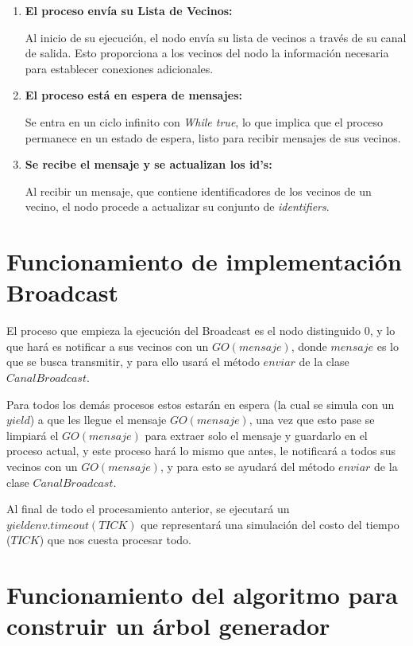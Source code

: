 \begin{enumerate}
	\item \textbf{El proceso envía su Lista de Vecinos:}
	
	Al inicio de su ejecución, el nodo envía su lista de vecinos a través de su canal de salida. Esto proporciona a los vecinos del nodo la información necesaria para establecer conexiones adicionales.
	
	\item \textbf{El proceso está en espera de mensajes: }
	
	 Se entra en un ciclo infinito con \textit{While true}, lo que implica que el proceso permanece en un estado de espera, listo para recibir mensajes de sus vecinos. 
	 
	 \item \textbf{Se recibe el mensaje y se actualizan los id's: }
	 
	  Al recibir un mensaje, que contiene identificadores de los vecinos de un vecino, el nodo procede a actualizar su conjunto de \textit{identifiers}. 
\end{enumerate}


\section{Funcionamiento de implementación Broadcast}

El proceso que empieza la ejecución del Broadcast es el nodo distinguido \(0\), y lo que hará es notificar a sus vecinos con un \(GO(mensaje)\), donde \(mensaje\) es lo que se busca transmitir, y para ello usará el método \(enviar\) de la clase \(CanalBroadcast\).

Para todos los demás procesos estos estarán en espera (la cual se simula con un \(yield\)) a que les llegue el mensaje \(GO(mensaje)\), una vez que esto pase se limpiará el \(GO(mensaje)\) para extraer solo el mensaje y guardarlo en el proceso actual, y este proceso hará lo mismo que antes, le notificará a todos sus vecinos con un \(GO(mensaje)\), y para esto se ayudará del método \(enviar\) de la clase \(CanalBroadcast\).

Al final de todo el procesamiento anterior, se ejecutará un \(yield env.timeout(TICK)\) que representará una simulación del costo del tiempo (\(TICK\)) que nos cuesta procesar todo.



\section{Funcionamiento del algoritmo para construir un árbol generador}

